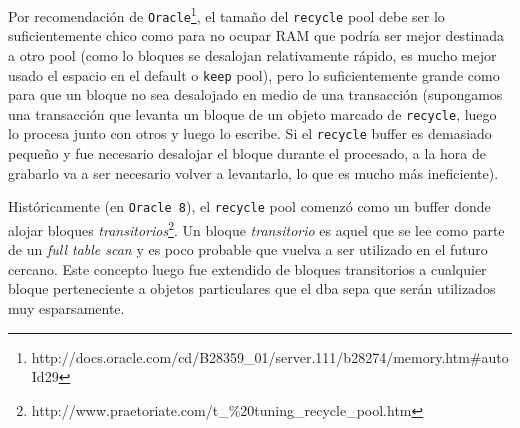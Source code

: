 Por recomendación de \texttt{Oracle}\footnote{http://docs.oracle.com/cd/B28359\_01/server.111/b28274/memory.htm\#autoId29}, el tamaño del \texttt{recycle} pool debe ser lo suficientemente chico como para no ocupar RAM que podría ser mejor destinada a otro pool (como lo bloques se desalojan relativamente rápido, es mucho mejor usado el espacio en el default o \texttt{keep} pool), pero lo suficientemente grande como para que un bloque no sea desalojado en medio de una transacción (supongamos una transacción que levanta un bloque de un objeto marcado de \texttt{recycle}, luego lo procesa junto con otros y luego lo escribe. Si el \texttt{recycle} buffer es demasiado pequeño y fue necesario desalojar el bloque durante el procesado, a la hora de grabarlo va a ser necesario volver a levantarlo, lo que es mucho más ineficiente).

Históricamente (en \texttt{Oracle 8}), el \texttt{recycle} pool comenzó como un buffer donde alojar bloques \textit{transitorios}\footnote{http://www.praetoriate.com/t\_\%20tuning\_recycle\_pool.htm}. Un bloque \textit{transitorio} es aquel que se lee como parte de un \textit{full table scan} y es poco probable que vuelva a ser utilizado en el futuro cercano. Este concepto luego fue extendido de bloques transitorios a cualquier bloque perteneciente a objetos particulares que el dba sepa que serán utilizados muy esparsamente.